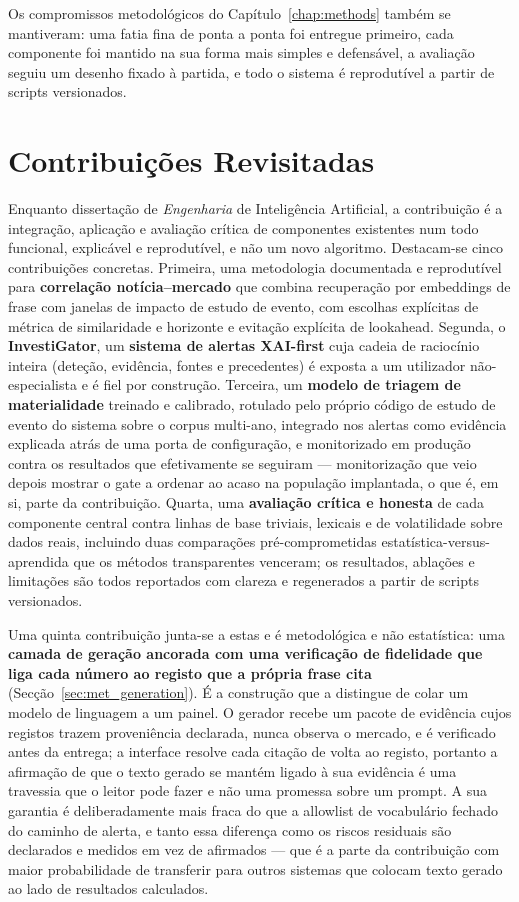 Os compromissos metodológicos do Capítulo~\ref{chap:methods} também se mantiveram: uma fatia fina de
ponta a ponta foi entregue primeiro, cada componente foi mantido na sua forma mais simples e defensável,
a avaliação seguiu um desenho fixado à partida, e todo o sistema é reprodutível a partir de scripts
versionados.

\section{Contribuições Revisitadas}
\label{sec:concl_contributions}

Enquanto dissertação de \emph{Engenharia} de Inteligência Artificial, a contribuição é a integração,
aplicação e avaliação crítica de componentes existentes num todo funcional, explicável e reprodutível,
e não um novo algoritmo. Destacam-se cinco contribuições concretas. Primeira, uma metodologia
documentada e reprodutível para \textbf{correlação notícia--mercado} que combina recuperação por
embeddings de frase com janelas de impacto de estudo de evento, com escolhas explícitas de métrica de
similaridade e horizonte e evitação explícita de lookahead. Segunda, o \textbf{InvestiGator}, um
\textbf{sistema de alertas XAI-first} cuja cadeia de raciocínio inteira (deteção, evidência, fontes e
precedentes) é exposta a um utilizador não-especialista e é fiel por construção. Terceira, um
\textbf{modelo de triagem de materialidade} treinado e calibrado, rotulado pelo próprio código de
estudo de evento do sistema sobre o corpus multi-ano, integrado nos alertas como evidência explicada
atrás de uma porta de configuração, e monitorizado em produção contra os resultados que
efetivamente se seguiram --- monitorização que veio depois mostrar o gate a ordenar ao acaso na
população implantada, o que é, em si, parte da contribuição. Quarta, uma \textbf{avaliação crítica e honesta} de cada componente central
contra linhas de base triviais, lexicais e de volatilidade sobre dados reais, incluindo duas
comparações pré-comprometidas estatística-versus-aprendida que os métodos transparentes venceram; os
resultados, ablações e limitações são todos reportados com clareza e regenerados a partir de scripts
versionados.

Uma quinta contribuição junta-se a estas e é metodológica e não estatística: uma \textbf{camada de
geração ancorada com uma verificação de fidelidade que liga cada número ao registo que a própria
frase cita} (Secção~\ref{sec:met_generation}). É a construção que a distingue de colar um modelo de
linguagem a um painel. O gerador recebe um pacote de evidência cujos registos trazem proveniência
declarada, nunca observa o mercado, e é verificado antes da entrega; a interface resolve cada citação
de volta ao registo, portanto a afirmação de que o texto gerado se mantém ligado à sua evidência é
uma travessia que o leitor pode fazer e não uma promessa sobre um prompt. A sua garantia é
deliberadamente mais fraca do que a allowlist de vocabulário fechado do caminho de alerta, e tanto
essa diferença como os riscos residuais são declarados e medidos em vez de afirmados --- que é a
parte da contribuição com maior probabilidade de transferir para outros sistemas que colocam texto
gerado ao lado de resultados calculados.

